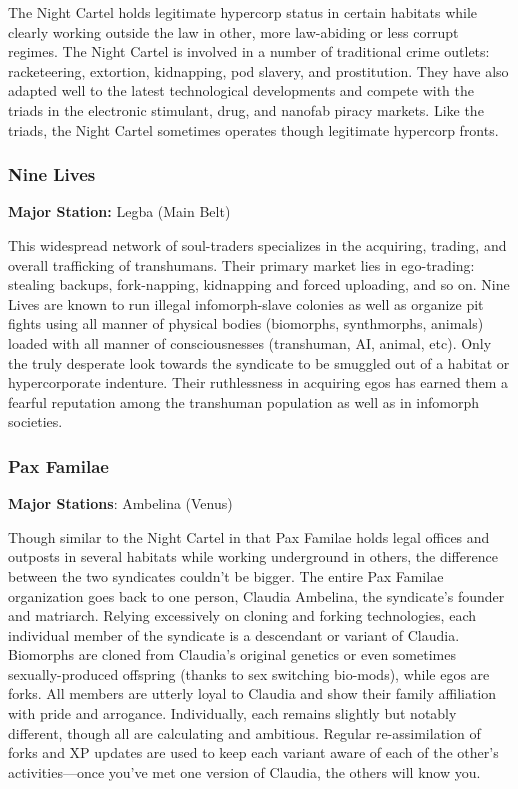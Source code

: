 The Night Cartel holds legitimate hypercorp status in certain habitats while clearly working outside the law in other, more law-abiding or less corrupt regimes. The Night Cartel is involved in a number of traditional crime outlets: racketeering, extortion, kidnapping, pod slavery, and prostitution. They have also adapted well to the latest technological developments and compete with the triads in the electronic stimulant, drug, and nanofab piracy markets. Like the triads, the Night Cartel sometimes operates though legitimate hypercorp fronts. 

\subsubsection{Nine Lives} \label{sec:nine-lives} 

\textbf{Major Station:} Legba (Main Belt) 

This widespread network of soul-traders specializes in the acquiring, trading, and overall trafficking of transhumans. Their primary market lies in ego-trading: stealing backups, fork-napping, kidnapping and forced uploading, and so on. Nine Lives are known to run illegal infomorph-slave colonies as well as organize pit fights using all manner of physical bodies (biomorphs, synthmorphs, animals) loaded with all manner of consciousnesses (transhuman, AI, animal, etc). Only the truly desperate look towards the syndicate to be smuggled out of a habitat or hypercorporate indenture. Their ruthlessness in acquiring egos has earned them a fearful reputation among the transhuman population as well as in infomorph societies. 

\subsubsection{Pax Familae} \label{sec:pax-familae} 

\textbf{Major Stations}: Ambelina (Venus) 

Though similar to the Night Cartel in that Pax Familae holds legal offices and outposts in several habitats while working underground in others, the difference between the two syndicates couldn't be bigger. The entire Pax Familae organization goes back to one person, Claudia Ambelina, the syndicate's founder and matriarch. Relying excessively on cloning and forking technologies, each individual member of the syndicate is a descendant or variant of Claudia. Biomorphs are cloned from Claudia's original genetics or even sometimes sexually-produced offspring (thanks to sex switching bio-mods), while egos are forks. All members are utterly loyal to Claudia and show their family affiliation with pride and arrogance. Individually, each remains slightly but notably different, though all are calculating and ambitious. Regular re-assimilation of forks and XP updates are used to keep each variant aware of each of the other's activities—once you've met one version of Claudia, the others will know you. 

